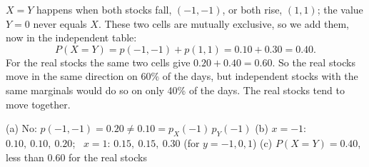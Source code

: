 \begin{solution}
	 $X=Y$ happens when both stocks fall, $(-1,-1)$, or both rise,
	$(1,1)$; the value $Y=0$ never equals $X$. These two cells are mutually
	exclusive, so we add them, now in the independent table:
	\[ P(X=Y)=p(-1,-1)+p(1,1)=0.10+0.30=0.40. \]
	For the real stocks the same two cells give $0.20+0.40=0.60$. So the real
	stocks move in the same direction on 60\% of the days, but independent
	stocks with the same marginals would do so on only 40\% of the days. The
	real stocks tend to move together.
	\begin{answer}
		(a) No: $p(-1,-1)=0.20\neq0.10=p_X(-1)\,p_Y(-1)$
		\quad (b) $x=-1$: $0.10,\ 0.10,\ 0.20$; \ $x=1$: $0.15,\ 0.15,\ 0.30$
		(for $y=-1,0,1$)
		\quad (c) $P(X=Y)=0.40$, less than $0.60$ for the real stocks
	\end{answer}
\end{solution}
